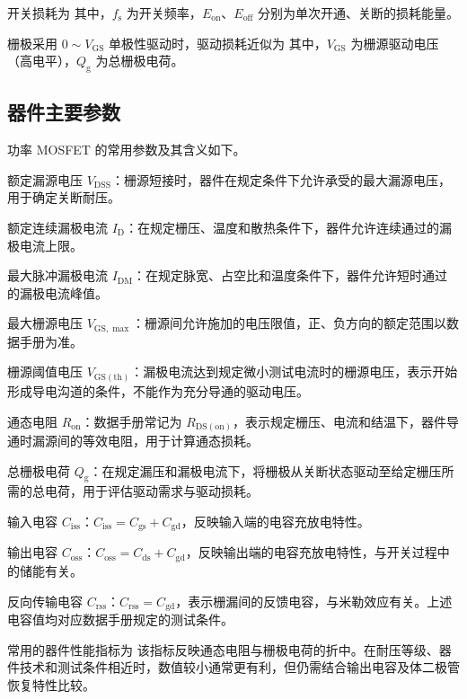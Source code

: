 开关损耗为
其中，$f_{\mathrm{s}}$ 为开关频率，$E_{\mathrm{on}}$、$E_{\mathrm{off}}$ 分别为单次开通、关断的损耗能量。

栅极采用 $0\sim V_{\mathrm{GS}}$ 单极性驱动时，驱动损耗近似为
其中，$V_{\mathrm{GS}}$ 为栅源驱动电压（高电平），$Q_{\mathrm{g}}$ 为总栅极电荷。

\subsection{器件主要参数}

功率 MOSFET 的常用参数及其含义如下。

额定漏源电压 $V_{\mathrm{DSS}}$：栅源短接时，器件在规定条件下允许承受的最大漏源电压，用于确定关断耐压。

额定连续漏极电流 $I_{\mathrm{D}}$：在规定栅压、温度和散热条件下，器件允许连续通过的漏极电流上限。

最大脉冲漏极电流 $I_{\mathrm{DM}}$：在规定脉宽、占空比和温度条件下，器件允许短时通过的漏极电流峰值。

最大栅源电压 $V_{\mathrm{GS,\max}}$：栅源间允许施加的电压限值，正、负方向的额定范围以数据手册为准。

栅源阈值电压 $V_{\mathrm{GS(th)}}$：漏极电流达到规定微小测试电流时的栅源电压，表示开始形成导电沟道的条件，不能作为充分导通的驱动电压。

通态电阻 $R_{\mathrm{on}}$：数据手册常记为 $R_{\mathrm{DS(on)}}$，表示规定栅压、电流和结温下，器件导通时漏源间的等效电阻，用于计算通态损耗。

总栅极电荷 $Q_{\mathrm{g}}$：在规定漏压和漏极电流下，将栅极从关断状态驱动至给定栅压所需的总电荷，用于评估驱动需求与驱动损耗。

输入电容 $C_{\mathrm{iss}}$：$C_{\mathrm{iss}}=C_{\mathrm{gs}}+C_{\mathrm{gd}}$，反映输入端的电容充放电特性。

输出电容 $C_{\mathrm{oss}}$：$C_{\mathrm{oss}}=C_{\mathrm{ds}}+C_{\mathrm{gd}}$，反映输出端的电容充放电特性，与开关过程中的储能有关。

反向传输电容 $C_{\mathrm{rss}}$：$C_{\mathrm{rss}}=C_{\mathrm{gd}}$，表示栅漏间的反馈电容，与米勒效应有关。上述电容值均对应数据手册规定的测试条件。

常用的器件性能指标为
该指标反映通态电阻与栅极电荷的折中。在耐压等级、器件技术和测试条件相近时，数值较小通常更有利，但仍需结合输出电容及体二极管恢复特性比较。

\newpage{}


